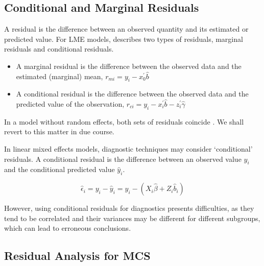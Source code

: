 \documentclass[Main.tex]{subfiles}
\begin{document}
\newpage


\subsection{Conditional and Marginal Residuals}
A residual is the difference between an observed quantity and its estimated or predicted value. For LME models, \citet{schab} describes two types of residuals, marginal residuals and conditional residuals. 

\begin{itemize}
	\item A marginal residual is the difference between the observed data and the estimated (marginal) mean, $r_{mi} = y_i - x_0^{\prime} \hat{b}$
	\item A conditional residual is the difference between the observed data and the predicted value of the observation,
	$r_{ci} = y_i - x_i^{\prime} \hat{b} - z_i^{\prime} \hat{\gamma}$	
\end{itemize} 
In a model without random effects, both sets of
residuals coincide \citep{schab} . We shall revert to this matter in due course.







In linear mixed effects models, diagnostic techniques may consider `conditional' residuals. A conditional residual is the difference between an observed value $y_{i}$ and the conditional predicted value $\hat{y}_{i} $.

\[ \hat{\epsilon}_{i} = y_{i} - \hat{y}_{i} = y_{i} - ( X_{i}\hat{\beta} + Z_{i}\hat{b}_{i}) \]

However, using conditional residuals for diagnostics presents difficulties, as they tend to be correlated and their variances may be different for different subgroups, which can lead to erroneous conclusions.


\newpage
\subsection{Residual Analysis for MCS}
\end{document}
